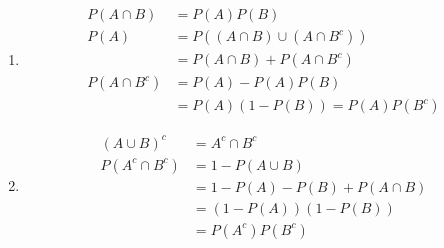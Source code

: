\documentclass[../../probability-notex.tex]{subfiles}
\begin{document}
    \begin{enumerate}
        \item 
        \begin{align*}
            P(A \cap B) &= P(A) P(B)\\
            P(A) &= P((A \cap B) \cup (A \cap B^{c}))\\
                &= P(A \cap B) + P(A \cap B^{c}) \tag*{since disjoint}\\
            P(A \cap B^{c}) &= P(A) - P(A)P(B)\\
                &= P(A)(1 - P(B)) = P(A)P(B^{c})
        \end{align*}
        \item 
        \begin{align*}
            (A \cup B)^{c} &= A^{c} \cap B^{c}\\
            P(A^{c} \cap B^{c}) &= 1 - P(A \cup B)\\
                            &= 1 - P(A) - P(B) + P(A \cap B)\\
                            &= (1 - P(A))(1 - P(B))\\
                            &= P(A^{c})P(B^{c})
        \end{align*}
    \end{enumerate}
\end{document}
